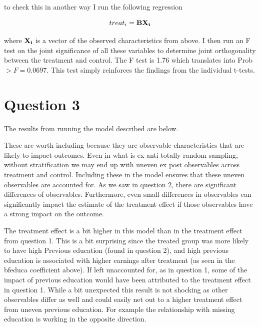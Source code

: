 \documentclass[11pt]{article}
\begin{document}
to check this in another way I run the following regression 

$$ treat_i = \bf{B}\bf{X_i} $$

where $\bf{X_i}$ is a vector of the observed characteristics from above. I then run an F test on the joint significance of all these variables to determine joint orthogonality between the treatment and control. The F test is  1.76 which translates into Prob $> F  =  0.0697$. This test simply reinforces the findings from the individual t-tests. 



\section{ Question 3}

The results from running the model described are below. 

\begin{center}
	
		
	
\end{center}

These are worth including because they are observable characteristics that are likely to impact outcomes. Even in what is ex anti totally random sampling, without stratification we may end up with uneven ex post observables across treatment and control. Including these in the model ensures that these uneven observables are accounted for. As we saw in question 2, there are significant differences of observables. Furthermore, even small differences in observables can significantly impact the estimate of the treatment effect if those observables have a strong impact on the outcome. \par 

The treatment effect is a bit higher in this model than in the treatment effect from question 1. This is a bit surprising since the treated group was more likely to have high Previous education (found in question 2), and high previous education is associated with higher earnings after treatment (as seen in the bfeduca coefficient above). If left unaccounted for, as in question 1, some of the impact of previous education would have been attributed to the treatment effect in question 1. While a bit unexpected this result is not shocking as other observables differ as well and could easily net out to a higher treatment effect from uneven previous education. For example the relationship with missing education is working in the opposite direction. 
\end{document}
